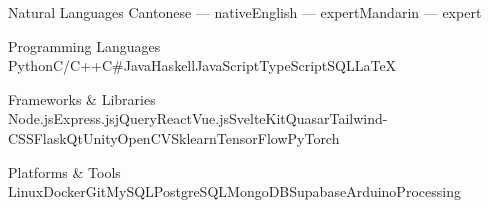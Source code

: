 \skillEntry
{Natural Languages}
{Cantonese --- native\quad English --- expert\quad Mandarin --- expert}
{}{}

\skillEntry
{Programming Languages}
{Python\quad C/C++\quad C\#\quad Java\quad Haskell\quad JavaScript\quad TypeScript\quad SQL\quad \LaTeX}
{}{}

\skillEntry
{Frameworks \& Libraries}
{Node.js\quad Express.js\quad jQuery\quad React\quad Vue.js\quad SvelteKit\quad Quasar\quad Tailwind-CSS\quad Flask\quad Qt\quad Unity\quad OpenCV\quad Sklearn\quad TensorFlow\quad PyTorch}
{}{}

\skillEntry
{Platforms \& Tools}
{Linux\quad Docker\quad Git\quad MySQL\quad PostgreSQL\quad MongoDB\quad Supabase\quad Arduino\quad Processing}
{}{}